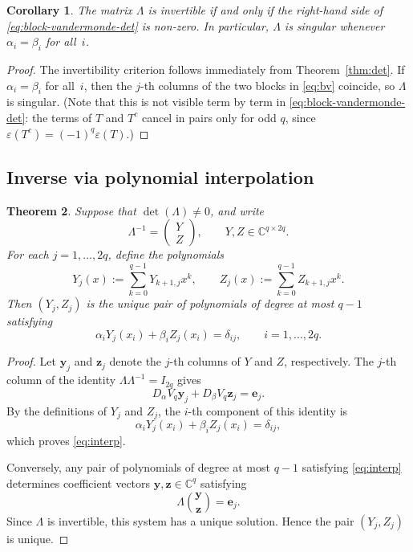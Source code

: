 \documentclass[11pt,a4paper]{article}
\newtheorem{theorem}{Theorem}[section]
\newtheorem{corollary}[theorem]{Corollary}
\theoremstyle{definition}
\begin{document}
\begin{corollary}\label{cor:invert}
The matrix $\Lambda$ is
invertible if and only if the right-hand side of \eqref{eq:block-vandermonde-det} is
non-zero. In particular, $\Lambda$ is singular whenever $\alpha_i=\beta_i$
for all~$i$.
\end{corollary}

\begin{proof}
The invertibility criterion follows immediately from
Theorem~\ref{thm:det}. If $\alpha_i=\beta_i$ for
all~$i$, then the $j$-th columns of the two blocks in \eqref{eq:bv}
coincide, so $\Lambda$ is singular. (Note that this is not visible
term by term in \eqref{eq:block-vandermonde-det}: the terms of $T$ and $T^c$ cancel in
pairs only for odd $q$, since
$\varepsilon(T^c)=(-1)^{q}\varepsilon(T)$.)
\end{proof}

\subsection{Inverse via polynomial interpolation}

\begin{theorem}\label{thm:inv-interp}
Suppose that $\det(\Lambda)\ne0$, and write
\[
\Lambda^{-1}
=
\begin{pmatrix}
Y\\
Z
\end{pmatrix},
\qquad
Y,Z\in\mathbb C^{q\times 2q}.
\]
For each $j=1,\dots,2q$, define the polynomials
\[
Y_j(x)
:=
\sum_{k=0}^{q-1}Y_{k+1,j}x^k,
\qquad
Z_j(x)
:=
\sum_{k=0}^{q-1}Z_{k+1,j}x^k.
\]
Then $(Y_j,Z_j)$ is the unique pair of polynomials of degree at most
$q-1$ satisfying
\begin{equation}\label{eq:interp}
\alpha_iY_j(x_i)+\beta_iZ_j(x_i)
=
\delta_{ij},
\qquad
i=1,\dots,2q.
\end{equation}
\end{theorem}

\begin{proof}
Let $\mathbf y_j$ and $\mathbf z_j$ denote the $j$-th columns of
$Y$ and $Z$, respectively. The $j$-th column of the identity
$\Lambda\Lambda^{-1}=I_{2q}$ gives
\[
D_\alpha V_q\mathbf y_j
+
D_\beta V_q\mathbf z_j
=
\mathbf e_j.
\]
By the definitions of $Y_j$ and $Z_j$, the $i$-th component of this
identity is
\[
\alpha_iY_j(x_i)+\beta_iZ_j(x_i)
=
\delta_{ij},
\]
which proves \eqref{eq:interp}.

Conversely, any pair of polynomials of degree at most $q-1$
satisfying \eqref{eq:interp} determines coefficient vectors
$\mathbf y,\mathbf z\in\mathbb C^q$ satisfying
\[
\Lambda
\binom{\mathbf y}{\mathbf z}
=
\mathbf e_j.
\]
Since $\Lambda$ is invertible, this system has a unique solution.
Hence the pair $(Y_j,Z_j)$ is unique.
\end{proof}
\end{document}
